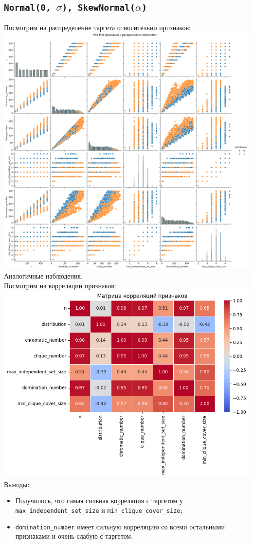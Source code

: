 \documentclass[12pt,a4paper]{report}
\begin{document}
\subsection{\texttt{Normal(0, $\sigma$), SkewNormal($\alpha$)}}
Посмотрим на распределение таргета относительно признаков:\\
\includegraphics[width=1\linewidth]{img/dist-norm-snorm.png}
Аналогичные наблюдения.\\
Посмотрим на корреляции признаков:\\
\includegraphics[width=1\linewidth]{img/corr-norm-snorm.png}
Выводы:
\begin{itemize}
    \item Получилось, что самая сильная корреляция с таргетом у \texttt{max\_independent\_set\_size} и \texttt{min\_clique\_cover\_size};
    \item \texttt{domination\_number} имеет сильную корреляцию со всеми остальными признаками и очень слабую с таргетом.
\end{itemize}
\end{document}
